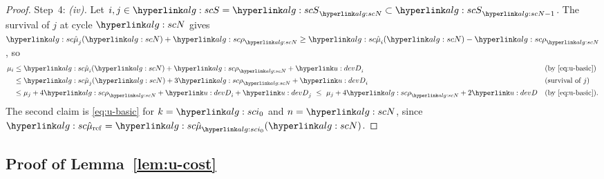\documentclass[11pt]{article}
\newcommand{\1}{\mathbf{1}}
\begin{document}
\begin{proof}
Step~4: \emph{(iv).} Let $i,j\in\uS=\uS_\uN\subset\uS_{\uN-1}$. The survival of $j$ at cycle $\uN$ gives $\umuh_j(\uN)+\urho_\uN\ge\umuh_i(\uN)-\urho_\uN$, so
\begin{align*}
\mu_i&\le\umuh_i(\uN)+\urho_\uN+\uD_i &&\text{(by \eqref{eq:u-basic})}\\
&\le\umuh_j(\uN)+3\urho_\uN+\uD_i &&\text{(survival of $j$)}\\
&\le\mu_j+4\urho_\uN+\uD_i+\uD_j\ \le\ \mu_j+4\urho_\uN+2\uD &&\text{(by \eqref{eq:u-basic})}.
\end{align*}
The second claim is \eqref{eq:u-basic} for $k=\uio$ and $n=\uN$, since $\umuref=\umuh_{\uio}(\uN)$.
\end{proof}

\subsection{Proof of Lemma~\ref{lem:u-cost}}
\end{document}

